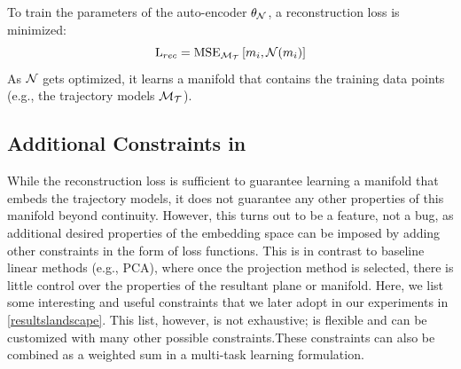 \documentclass[letterpaper]{article} %
\begin{document}
            To train the parameters of the auto-encoder $\theta_{\mathcal{N}}$, a reconstruction loss is minimized:
            \begin{equation}
                \text{L}_{rec} =  \text{MSE}_{\mathcal{M_T}} \left[ m_{i} ,  \mathcal{N}({m_i}) \right]
            \end{equation}
            As $\mathcal{N}$ gets optimized, it learns 
            a manifold that contains the training data points (e.g., the trajectory models $\mathcal{M_T}$).%

            \subsection{Additional  Constraints in \proposedautencoder{}} \label{se:constaints}
            
            While the reconstruction loss is sufficient to guarantee learning a manifold that embeds the trajectory models, it does not guarantee any other properties of this manifold beyond continuity. However, this turns out to be a feature, not a bug, as additional desired properties of the embedding space can be imposed by adding other constraints in the form of loss functions. This is in contrast to baseline linear methods (e.g., PCA), where once the projection method is selected, there is little control over the properties of the resultant plane or manifold. 
                        Here, we list some interesting and useful constraints that we later adopt in our experiments in \cref{resultslandscape}. This list, however, is not exhaustive;
            \proposedautencoder{} is flexible and can be customized with many other possible constraints.These constraints can also be combined as a weighted sum in a multi-task learning formulation. 
            
\end{document}
